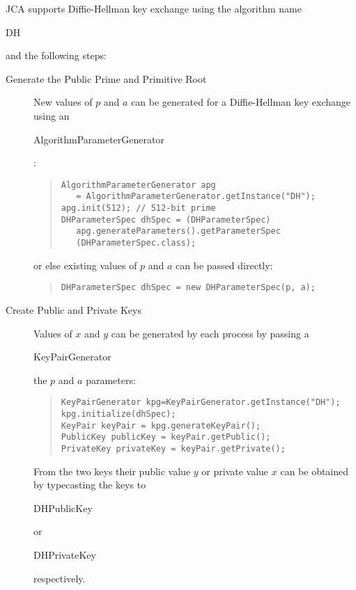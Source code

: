 JCA supports Diffie-Hellman key exchange using the algorithm name \begin{code}DH\end{code}
and the following steps:
\begin{description}
  \item[Generate the Public Prime and Primitive Root]
  New values of $p$ and $a$ can be generated for a Diffie-Hellman key exchange
  using an \begin{code}Algorithm\-ParameterGenerator\end{code}:
\begin{quote}\begin{code}\begin{verbatim}
AlgorithmParameterGenerator apg
   = AlgorithmParameterGenerator.getInstance("DH");
apg.init(512); // 512-bit prime
DHParameterSpec dhSpec = (DHParameterSpec)
   apg.generateParameters().getParameterSpec
   (DHParameterSpec.class);
\end{verbatim}\end{code}\end{quote}
  or else existing values of $p$ and $a$ can be passed directly:
\begin{quote}\begin{code}\begin{verbatim}
DHParameterSpec dhSpec = new DHParameterSpec(p, a);
\end{verbatim}\end{code}\end{quote}

  \item[Create Public and Private Keys]
  Values of $x$ and $y$ can be generated by each process
  by passing a \begin{code}KeyPairGenerator\end{code}
  the $p$ and $a$ parameters:
\begin{quote}\begin{code}\begin{verbatim}
KeyPairGenerator kpg=KeyPairGenerator.getInstance("DH");
kpg.initialize(dhSpec);
KeyPair keyPair = kpg.generateKeyPair();
PublicKey publicKey = keyPair.getPublic();
PrivateKey privateKey = keyPair.getPrivate();
\end{verbatim}\end{code}\end{quote}
  From the two keys their public value $y$ or private value $x$ can be obtained
  by typecasting the keys to \begin{code}DHPublicKey\end{code} or
  \begin{code}DHPrivateKey\end{code} respectively.


\end{description}

